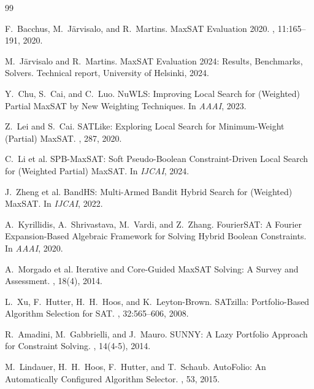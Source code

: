\documentclass[11pt,letterpaper]{article}
\begin{document}

\begin{thebibliography}{99}

F.~Bacchus, M.~J\"arvisalo, and R.~Martins.
\newblock MaxSAT Evaluation 2020.
, 11:165--191, 2020.

M.~J\"arvisalo and R.~Martins.
\newblock MaxSAT Evaluation 2024: Results, Benchmarks, Solvers.
\newblock Technical report, University of Helsinki, 2024.

Y.~Chu, S.~Cai, and C.~Luo.
\newblock NuWLS: Improving Local Search for (Weighted) Partial MaxSAT by New Weighting Techniques.
\newblock In {\em AAAI}, 2023.

Z.~Lei and S.~Cai.
\newblock SATLike: Exploring Local Search for Minimum-Weight (Partial) MaxSAT.
, 287, 2020.

C.~Li et al.
\newblock SPB-MaxSAT: Soft Pseudo-Boolean Constraint-Driven Local Search for (Weighted Partial) MaxSAT.
\newblock In {\em IJCAI}, 2024.

J.~Zheng et al.
\newblock BandHS: Multi-Armed Bandit Hybrid Search for (Weighted) MaxSAT.
\newblock In {\em IJCAI}, 2022.

A.~Kyrillidis, A.~Shrivastava, M.~Vardi, and Z.~Zhang.
\newblock FourierSAT: A Fourier Expansion-Based Algebraic Framework for Solving Hybrid Boolean Constraints.
\newblock In {\em AAAI}, 2020.

A.~Morgado et al.
\newblock Iterative and Core-Guided MaxSAT Solving: A Survey and Assessment.
, 18(4), 2014.

L.~Xu, F.~Hutter, H.~H.~Hoos, and K.~Leyton-Brown.
\newblock SATzilla: Portfolio-Based Algorithm Selection for SAT.
, 32:565--606, 2008.

R.~Amadini, M.~Gabbrielli, and J.~Mauro.
\newblock SUNNY: A Lazy Portfolio Approach for Constraint Solving.
, 14(4-5), 2014.

M.~Lindauer, H.~H.~Hoos, F.~Hutter, and T.~Schaub.
\newblock AutoFolio: An Automatically Configured Algorithm Selector.
, 53, 2015.

\end{thebibliography}
\end{document}
